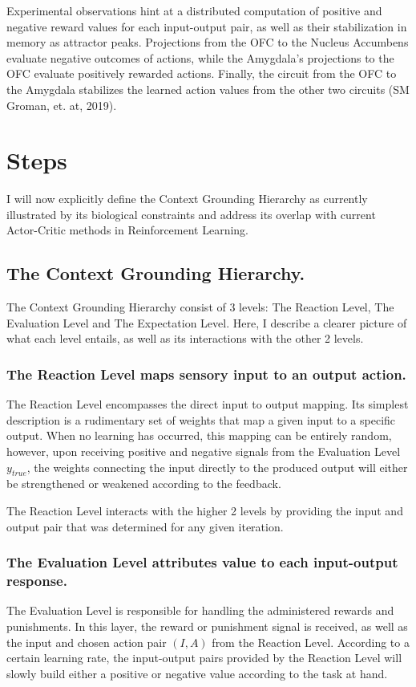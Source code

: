 \documentclass[11pt]{article}
\begin{document}
Experimental observations hint at a distributed computation of positive and negative reward values for each input-output pair, as well as their stabilization in memory as attractor peaks.  Projections from the OFC to the Nucleus Accumbens evaluate negative outcomes of actions, while the Amygdala's projections to the OFC evaluate positively rewarded actions.  Finally, the circuit from the OFC to the Amygdala stabilizes the learned action values from the other two circuits (SM Groman, et. at, 2019).


\section{Steps}
I will now explicitly define the Context Grounding Hierarchy as currently illustrated by its biological constraints and address its overlap with current Actor-Critic methods in Reinforcement Learning.

\subsection{The Context Grounding Hierarchy.}
The Context Grounding Hierarchy consist of 3 levels: The Reaction Level, The Evaluation Level and The Expectation Level.  Here, I describe a clearer picture of what each level entails, as well as its interactions with the other 2 levels.

\subsubsection{The Reaction Level maps sensory input to an output action.}
The Reaction Level encompasses the direct input to output mapping.  Its simplest description is a rudimentary set of weights that map a given input to a specific output.  When no learning has occurred, this mapping can be entirely random, however, upon receiving positive and negative signals from the Evaluation Level $y_{true}$, the weights connecting the input directly to the produced output will either be strengthened or weakened according to the feedback.

The Reaction Level interacts with the higher 2 levels by providing the input and output pair that was determined for any given iteration.

\subsubsection{The Evaluation Level attributes value to each input-output response.}
The Evaluation Level is responsible for handling the administered rewards and punishments.  In this layer, the reward or punishment signal is received, as well as the input and chosen action pair $(I, A)$ from the Reaction Level.  According to a certain learning rate, the input-output pairs provided by the Reaction Level will slowly build either a positive or negative value according to the task at hand.
\end{document}
